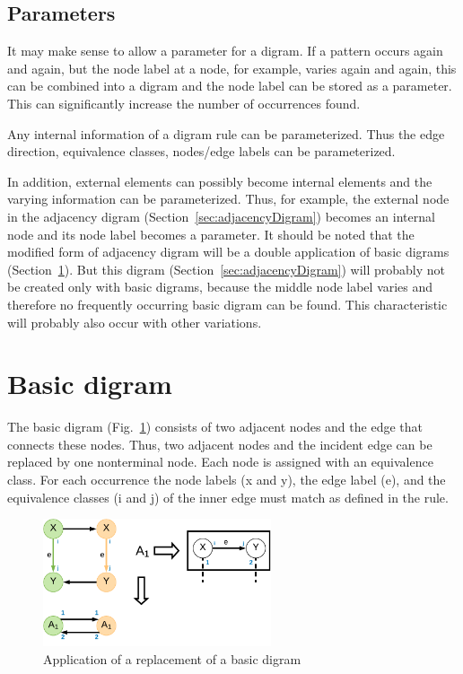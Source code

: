 \documentclass[a4paper]{scrartcl}
\begin{document}
\subsection*{Parameters}

It may make sense to allow a parameter for a digram. If a pattern occurs again and again, but the node label at a node, for example, varies again and again, this can be combined into a digram and the node label can be stored as a parameter. This can significantly increase the number of occurrences found.

Any internal information of a digram rule can be parameterized. Thus the edge direction, equivalence classes, nodes/edge labels can be parameterized.

In addition, external elements can possibly become internal elements and the varying information can be parameterized. Thus, for example, the external node in the adjacency digram (Section~\ref{sec:adjacencyDigram}) becomes an internal node and its node label becomes a parameter.
It should be noted that the modified form of adjacency digram will be a double application of basic digrams (Section~\ref{sec:basicDigram}). But this digram (Section~\ref{sec:adjacencyDigram}) will probably not be created only with basic digrams, because the middle node label varies and therefore no frequently occurring basic digram can be found. This characteristic will probably also occur with other variations.




\section{Basic digram}
\label{sec:basicDigram}


The basic digram (Fig.~\ref{fig:basicDigram}) consists of two adjacent nodes and the edge that connects these nodes. Thus, two adjacent nodes and the incident edge can be replaced by one nonterminal node. Each node is assigned with an equivalence class. For each occurrence the node labels (x and y), the edge label (e), and the equivalence classes (i and j) of the inner edge must match as defined in the rule.

\begin{figure}[h]
	\centering
	\includegraphics[width=0.6\textwidth]{img/basicDigram}
	\caption{Application of a replacement of a basic digram}
	\label{fig:basicDigram}
\end{figure}
\end{document}
